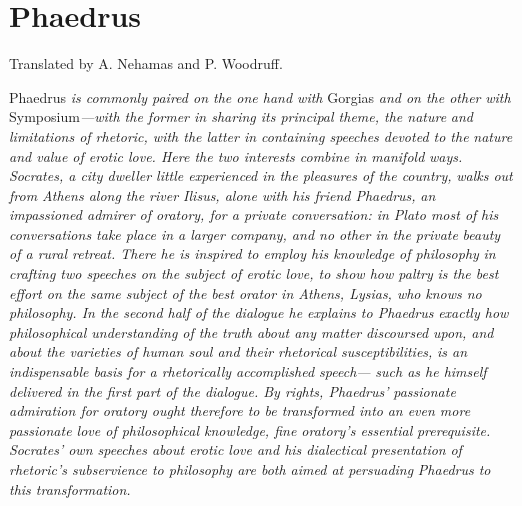 \chapter[Phaedrus]{Phaedrus}

Translated by A. Nehamas and P. Woodruff.

Phaedrus {\em is commonly paired on the one hand with} Gorgias {\em and
on the other} {\em with} Symposium{\em ---with the former in sharing its
principal theme, the nature} {\em and limitations of rhetoric, with the
latter in containing speeches devoted to the} {\em nature and value of
erotic love. Here the two interests combine in manifold} {\em ways.
Socrates, a city dweller little experienced in the pleasures of the
country,} {\em walks out from Athens along the river Ilisus, alone with
his friend Phaedrus,} {\em an impassioned admirer of oratory, for a
private conversation: in Plato most of} {\em his conversations take
place in a larger company, and no other in the private} {\em beauty of a
rural retreat. There he is inspired to employ his knowledge of
philosophy} {\em in crafting two speeches on the subject of erotic love,
to show how paltry} {\em is the best effort on the same subject of the
best orator in Athens, Lysias, who} {\em knows no philosophy. In the
second half of the dialogue he explains to Phaedrus} {\em exactly how
philosophical understanding of the truth about any matter}
{\em discoursed upon, and about the varieties of human soul and their
rhetorical susceptibilities,} {\em is an indispensable basis for a
rhetorically accomplished speech---} {\em such as he himself delivered
in the first part of the dialogue. By rights, Phaedrus'} {\em passionate
admiration for oratory ought therefore to be transformed into} {\em an
even more passionate love of philosophical knowledge, fine oratory's
essential} {\em prerequisite. Socrates' own speeches about erotic love
and his dialectical presentation} {\em of rhetoric's subservience to
philosophy are both aimed at persuading} {\em Phaedrus to this
transformation.}

